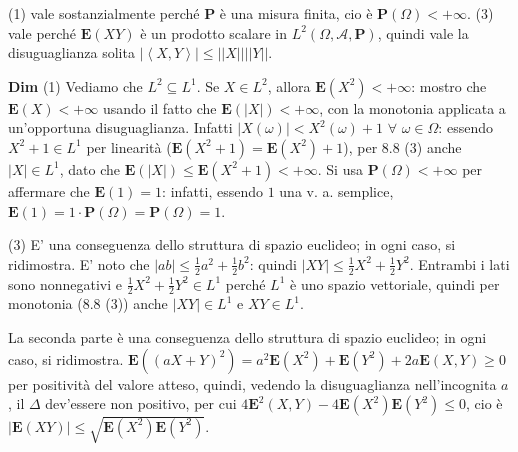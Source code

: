 \documentclass{article}
\begin{document}
(1) vale sostanzialmente perch\'{e} $\mathbf{P}$ \`{e} una misura finita, cio%
\`{e} $\mathbf{P}\left( \Omega \right) <+\infty $. (3) vale perch\'{e} $%
\mathbf{E}\left( XY\right) $ \`{e} un prodotto scalare in $L^{2}\left(
\Omega ,\mathcal{A},\mathbf{P}\right) $, quindi vale la disuguaglianza
solita $\left\vert \left\langle X,Y\right\rangle \right\vert \leq \left\vert
\left\vert X\right\vert \right\vert \left\vert \left\vert Y\right\vert
\right\vert $.

\textbf{Dim} (1) Vediamo che $L^{2}\subseteq L^{1}$. Se $X\in L^{2}$, allora 
$\mathbf{E}\left( X^{2}\right) <+\infty $: mostro che $\mathbf{E}\left(
X\right) <+\infty $ usando il fatto che $\mathbf{E}\left( \left\vert
X\right\vert \right) <+\infty $, con la monotonia applicata a un'opportuna
disuguaglianza. Infatti $\left\vert X\left( \omega \right) \right\vert
<X^{2}\left( \omega \right) +1$ $\forall $ $\omega \in \Omega $: essendo $%
X^{2}+1\in L^{1}$ per linearit\`{a} ($\mathbf{E}\left( X^{2}+1\right) =%
\mathbf{E}\left( X^{2}\right) +1$), per 8.8 (3) anche $\left\vert
X\right\vert \in L^{1}$, dato che $\mathbf{E}\left( \left\vert X\right\vert
\right) \leq \mathbf{E}\left( X^{2}+1\right) <+\infty $. Si usa $\mathbf{P}%
\left( \Omega \right) <+\infty $ per affermare che $\mathbf{E}\left(
1\right) =1$: infatti, essendo $1$ una v. a. semplice, $\mathbf{E}\left(
1\right) =1\cdot \mathbf{P}\left( \Omega \right) =\mathbf{P}\left( \Omega
\right) =1$.

(3) E' una conseguenza dello struttura di spazio euclideo; in ogni caso, si
ridimostra. E' noto che $\left\vert ab\right\vert \leq \frac{1}{2}a^{2}+%
\frac{1}{2}b^{2}$: quindi $\left\vert XY\right\vert \leq \frac{1}{2}X^{2}+%
\frac{1}{2}Y^{2}$. Entrambi i lati sono nonnegativi e $\frac{1}{2}X^{2}+%
\frac{1}{2}Y^{2}\in L^{1}$ perch\'{e} $L^{1}$ \`{e} uno spazio vettoriale,
quindi per monotonia (8.8 (3)) anche $\left\vert XY\right\vert \in L^{1}$ e $%
XY\in L^{1}$.

La seconda parte \`{e} una conseguenza dello struttura di spazio euclideo;
in ogni caso, si ridimostra. $\mathbf{E}\left( \left( aX+Y\right)
^{2}\right) =a^{2}\mathbf{E}\left( X^{2}\right) +\mathbf{E}\left(
Y^{2}\right) +2a\mathbf{E}\left( X,Y\right) \geq 0$ per positivit\`{a} del
valore atteso, quindi, vedendo la disuguaglianza nell'incognita $a$, il $%
\Delta $ dev'essere non positivo, per cui $4\mathbf{E}^{2}\left( X,Y\right)
-4\mathbf{E}\left( X^{2}\right) \mathbf{E}\left( Y^{2}\right) \leq 0$, cio%
\`{e} $\left\vert \mathbf{E}\left( XY\right) \right\vert \leq \sqrt{\mathbf{E%
}\left( X^{2}\right) \mathbf{E}\left( Y^{2}\right) }$.
\end{document}
